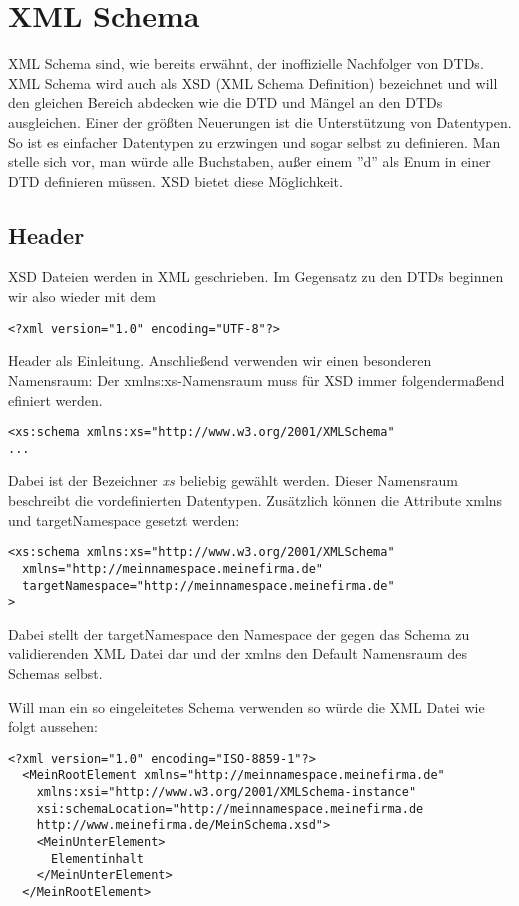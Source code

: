 \section{XML Schema}\label{Schema}
XML Schema sind, wie bereits erwähnt, der inoffizielle Nachfolger von DTDs. XML Schema wird auch als XSD (XML Schema
Definition) bezeichnet und will den gleichen Bereich abdecken wie die DTD und Mängel an den DTDs ausgleichen. Einer der
größten Neuerungen ist die Unterstützung von Datentypen. So ist es einfacher Datentypen zu erzwingen und sogar selbst zu
definieren. Man stelle sich vor, man würde alle Buchstaben, außer einem ''d'' als Enum in einer DTD definieren müssen.
XSD bietet diese Möglichkeit.

\subsection{Header}
XSD Dateien werden in XML geschrieben. Im Gegensatz zu den DTDs beginnen wir also wieder mit dem 
\begin{verbatim}
<?xml version="1.0" encoding="UTF-8"?>
\end{verbatim}
Header als Einleitung. Anschließend verwenden wir einen besonderen Namensraum: Der xmlns:xs-Namensraum muss für XSD
immer folgendermaßend efiniert werden.
\begin{verbatim}
<xs:schema xmlns:xs="http://www.w3.org/2001/XMLSchema"
...
\end{verbatim}
Dabei ist der Bezeichner \textit{xs} beliebig gewählt werden. Dieser Namensraum beschreibt die vordefinierten Datentypen. 
Zusätzlich können die Attribute xmlns und targetNamespace gesetzt werden:
\begin{verbatim}
<xs:schema xmlns:xs="http://www.w3.org/2001/XMLSchema"
  xmlns="http://meinnamespace.meinefirma.de"
  targetNamespace="http://meinnamespace.meinefirma.de"
>
\end{verbatim}
Dabei stellt der targetNamespace den Namespace der gegen das Schema zu validierenden XML Datei dar und der xmlns den
Default Namensraum des Schemas selbst.

Will man ein so eingeleitetes Schema verwenden so würde die XML Datei wie folgt aussehen:
\begin{verbatim}
<?xml version="1.0" encoding="ISO-8859-1"?>
  <MeinRootElement xmlns="http://meinnamespace.meinefirma.de"
    xmlns:xsi="http://www.w3.org/2001/XMLSchema-instance"
    xsi:schemaLocation="http://meinnamespace.meinefirma.de
    http://www.meinefirma.de/MeinSchema.xsd">
    <MeinUnterElement>
      Elementinhalt
    </MeinUnterElement>
  </MeinRootElement>
\end{verbatim}

